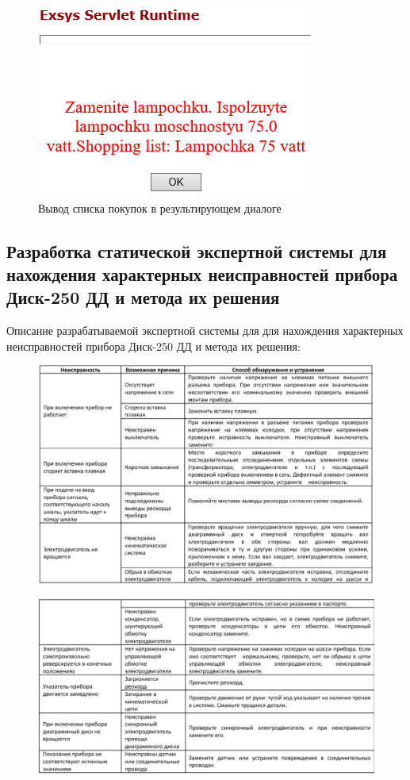 \documentclass[14pt,a4paper,report]{report}
\begin{document}
\begin{figure}[h!]
	\centering
	\includegraphics[scale = 1.1]{images/6_2.png}
	\caption{Вывод списка покупок в результирующем диалоге}
\end{figure}

\subsection{Разработка статической экспертной системы для нахождения характерных неисправностей прибора Диск-250 ДД и метода их решения}

Описание разрабатываемой экспертной системы для для нахождения характерных неисправностей прибора Диск-250 ДД и метода их решения:

\begin{figure}[h!]
	\centering
	\includegraphics[scale = 0.65]{images/7_x1.png}
\end{figure}

\begin{figure}[h!]
	\centering
	\includegraphics[scale = 0.65]{images/7_x2.png}
\end{figure}
\end{document}
